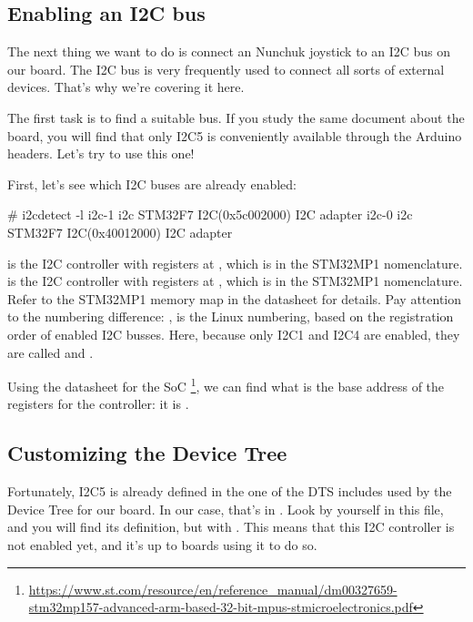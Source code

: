 \subsection{Enabling an I2C bus}

The next thing we want to do is connect an Nunchuk joystick
to an I2C bus on our board. The I2C bus is very frequently used
to connect all sorts of external devices. That's why we're covering
it here.

The first task is to find a suitable bus. If you study the
same document about the board, you will find that only I2C5 is
conveniently available through the Arduino headers. Let's try
to use this one!

First, let's see which I2C buses are already enabled:

\begin{bashinput}
# i2cdetect -l
i2c-1	i2c             STM32F7 I2C(0x5c002000)                 I2C adapter
i2c-0	i2c             STM32F7 I2C(0x40012000)                 I2C adapter
\end{bashinput}

 is the I2C controller with registers at
, which is  in the STM32MP1
nomenclature.  is the I2C controller with registers at
, which is  in the STM32MP1
nomenclature. Refer to the STM32MP1 memory map in the datasheet for
details. Pay attention to the numbering difference: ,
 is the Linux numbering, based on the registration order
of enabled I2C busses. Here, because only I2C1 and I2C4 are enabled,
they are called  and .

Using the datasheet for the SoC
\footnote{\url{https://www.st.com/resource/en/reference_manual/dm00327659-stm32mp157-advanced-arm-based-32-bit-mpus-stmicroelectronics.pdf}},
we can find what is the base address of the registers for the
 controller: it is .

\subsection{Customizing the Device Tree}

Fortunately, I2C5 is already defined in the one of the DTS includes
used by the Device Tree for our board. In our case, that's in
. Look by yourself in this
file, and you will find its definition, but with . This means that this I2C controller is not enabled yet,
and it's up to boards using it to do so.

